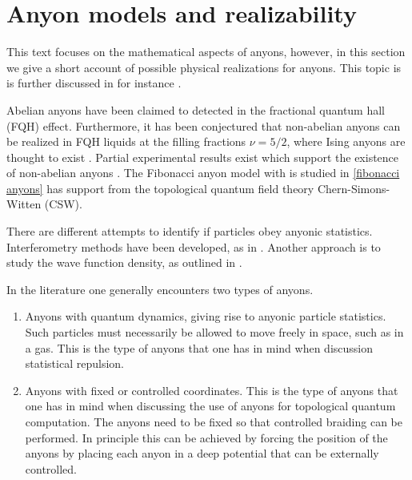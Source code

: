 \documentclass[a4paper,10pt,oneside]{book}
\theoremstyle{plain}
\theoremstyle{definition}
\theoremstyle{remark}
\begin{document}
\section{Anyon models and realizability}\label{sec:models and realizability}

This text focuses on the mathematical aspects of anyons, however, in this section we give a short account of possible physical realizations for anyons. This topic is is further discussed in for instance \cite{nayak,topological quantum compiling,slingerland bais}.

Abelian anyons have been claimed to detected in the fractional quantum hall (FQH) effect. \cite{abelian fqh} Furthermore, it has been conjectured that non-abelian anyons can be realized in FQH liquids at the filling fractions $\nu = 5/2$, where Ising anyons are thought to exist \cite{wang book}. Partial experimental results exist which support the existence of non-abelian anyons \cite{non-abelian experimental}. The Fibonacci anyon model with is studied in \cref{fibonacci anyons} has support from the topological quantum field theory Chern-Simons-Witten (CSW).

There are different attempts to identify if particles obey anyonic statistics. Interferometry methods have been developed, as in \cite{bonderson}. Another approach is to study the wave function density, as outlined in \cite{lundholm density}.

In the literature one generally encounters two types of anyons.
\begin{enumerate}
  \item Anyons with quantum dynamics, giving rise to anyonic particle statistics. Such particles must necessarily be allowed to move freely in space, such as in a gas. This is the type of anyons that one has in mind when discussion statistical repulsion.
  \item Anyons with fixed or controlled coordinates. This is the type of anyons that one has in mind when discussing the use of anyons for topological quantum computation. The anyons need to be fixed so that controlled braiding can be performed. In principle this can be achieved by forcing the position of the anyons by placing each anyon in a deep potential that can be externally controlled.
\end{enumerate}
\end{document}
